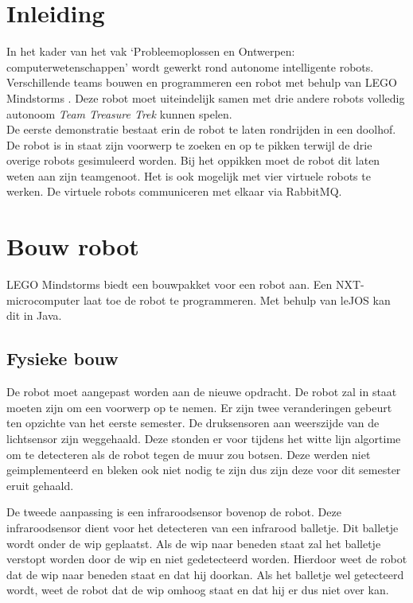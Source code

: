 \documentclass[tt1]{penoverslag}
\begin{document}
\newpage
\setcounter{tocdepth}{2}
\tableofcontents

\newpage


\section{Inleiding} %
\label{ssec:inl}
In het kader van het vak `Probleemoplossen en Ontwerpen: computerwetenschappen' wordt gewerkt rond autonome intelligente robots. Verschillende teams bouwen en programmeren een robot met behulp van LEGO Mindstorms \cite{mindstorms}. Deze robot moet uiteindelijk samen met drie andere robots volledig autonoom \textit{Team Treasure Trek} kunnen spelen.\\

De eerste demonstratie bestaat erin de robot te laten rondrijden in een doolhof. De robot is in staat zijn voorwerp te zoeken en op te pikken terwijl de drie overige robots gesimuleerd worden. Bij het oppikken moet de robot dit laten weten aan zijn teamgenoot. Het is ook mogelijk met vier virtuele robots te werken. De virtuele robots communiceren met elkaar via RabbitMQ.\\


\section{Bouw robot}
\label{ssec:bouwrob}
LEGO Mindstorms \cite{mindstorms} biedt een bouwpakket voor een robot aan. Een NXT-microcomputer laat toe de robot te programmeren. Met behulp van leJOS \cite{leJOS} kan dit in Java.


\subsection{Fysieke bouw}
\label{ssec:fysb}
De robot moet aangepast worden aan de nieuwe opdracht. De robot zal in staat moeten zijn om een voorwerp op te nemen. Er zijn twee veranderingen gebeurt ten opzichte van het eerste semester. De druksensoren aan weerszijde van de lichtsensor zijn weggehaald. Deze stonden er voor tijdens het witte lijn algortime om te detecteren als de robot tegen de muur zou botsen. Deze werden niet geimplementeerd en bleken ook niet nodig te zijn dus zijn deze voor dit semester eruit gehaald. 

De tweede aanpassing is een infraroodsensor bovenop de robot. Deze infraroodsensor dient voor het detecteren van een infrarood balletje. Dit balletje wordt onder de wip geplaatst. Als de wip naar beneden staat zal het balletje verstopt worden door de wip en niet gedetecteerd worden. Hierdoor weet de robot dat de wip naar beneden staat en dat hij doorkan. Als het balletje wel getecteerd wordt, weet de robot dat de wip omhoog staat en dat hij er dus niet over kan. \\
\end{document}
